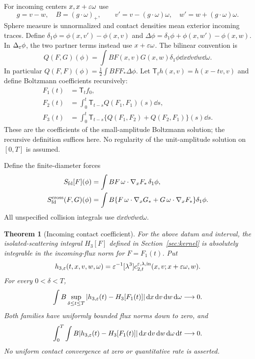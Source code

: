 \documentclass[11pt,letterpaper]{article}
\newtheorem{theorem}{Theorem}[section]
\theoremstyle{remark}\newtheorem{remark}[theorem]{Remark}
\numberwithin{equation}{section}
\newcommand{\Sfd}{S_{\mathrm{fd}}}\newcommand{\U}{\mathcal U}\newcommand{\D}{\mathcal D}
\begin{document}
For incoming centers $x,x+\varepsilon\omega$ use
\[
 g=v-w,\quad B=(g\cdot\omega)_+,\qquad
 v'=v-(g\cdot\omega)\omega,\quad w'=w+(g\cdot\omega)\omega.
\]
Sphere measure is unnormalized and contact densities mean exterior incoming traces. Define $\delta_1\phi=\phi(x,v')-\phi(x,v)$ and
$\Delta\phi=\delta_1\phi+\phi(x,w')-\phi(x,w)$. In $\Delta_\varepsilon\phi$, the two partner terms instead use $x+\varepsilon\omega$.
The bilinear convention is
\[
 Q(F,G)(\phi)=\int BF(x,v)G(x,w)\delta_1\phi\dd x\dd v\dd w\dd\omega.
\]
In particular $Q(F,F)(\phi)=\tfrac12\int BFF_*\Delta\phi$.
Let $\mathsf T_th(x,v)=h(x-tv,v)$ and define Boltzmann coefficients recursively:
\begin{align}
 F_1(t)&=\mathsf T_tf_0,\label{eq:Fn}\\
 F_2(t)&=\int_0^t\mathsf T_{t-s}Q(F_1,F_1)(s)\dd s,\nonumber\\
 F_3(t)&=\int_0^t\mathsf T_{t-s}\{Q(F_1,F_2)+Q(F_2,F_1)\}(s)\dd s.\nonumber
\end{align}
These are the coefficients of the small-amplitude Boltzmann solution; the recursive definition suffices here. No regularity of the unit-amplitude solution on $[0,T]$ is assumed.

Define the finite-diameter forces
\begin{align}
 \Sfd[F](\phi)&=\int BF\,\omega\cdot\nabla_xF_*\,\delta_1\phi,\label{eq:forces}\\
 \Sfd^{\rm cross}(F,G)(\phi)&=\int B\{F\,\omega\cdot\nabla_xG_*
                     +G\,\omega\cdot\nabla_xF_*\}\delta_1\phi.\nonumber
\end{align}
All unspecified collision integrals use $\dd x\dd v\dd w\dd\omega$.

\begin{theorem}[Incoming contact coefficient]\label{thm:contact}
For the above datum and interval, the isolated-scattering integral $H_3[F]$ defined in Section~\ref{sec:kernel} is absolutely integrable in the incoming-flux norm for $F=F_1(t)$. Put
\[
 h_{3,\varepsilon}(t,x,v,w,\omega)=\varepsilon^{-1}[\lambda^3]c_{2,t}^{\varepsilon,\lambda,\rm in}
                               (x,v;x+\varepsilon\omega,w).
\]
For every $0<\delta<T$,
\begin{equation}\label{eq:away}
 \int B\sup_{\delta\le t\le T}|h_{3,\varepsilon}(t)-H_3[F_1(t)]|
                              \,\mathrm d x\,\mathrm d v\,\mathrm d w\,\mathrm d\omega\longrightarrow0.
\end{equation}
Both families have uniformly bounded flux norms down to zero, and
\begin{equation}\label{eq:through-zero}
 \int_0^T\int B|h_{3,\varepsilon}(t)-H_3[F_1(t)]|
                              \,\mathrm d x\,\mathrm d v\,\mathrm d w\,\mathrm d\omega\,\mathrm d t\longrightarrow0.
\end{equation}
No uniform contact convergence at zero or quantitative rate is asserted.
\end{theorem}
\end{document}
